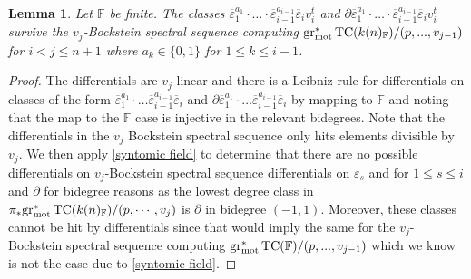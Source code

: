 \documentclass[english,10pt]{amsart}
\newcommand{\field}{\mathbb{F}}
\newtheorem{lemm}{Lemma}[section]
\theoremstyle{definition}
\numberwithin{equation}{section}
\DeclareMathOperator{\tc}{\ensuremath{\textup{TC}}}
\newcommand{\grmot}{\mathrm{gr}_{\textup{mot}}^*}
\newcommand{\pis}{\pi_*}
\begin{document}
\begin{lemm}
Let $\field$ be finite. 
The classes $\overline{\varepsilon}_1^{a_1}\cdot \ldots \cdot \overline{\varepsilon}_{i-1}^{a_{i-1}}\overline{\varepsilon}_{i}v_i^{t}$ and $\partial\overline{\varepsilon}_1^{a_1}\cdot \ldots \cdot \overline{\varepsilon}_{i-1}^{a_{i-1}}\overline{\varepsilon}_{i}v_i^{t}$ survive the $v_j$-Bockstein spectral sequence  computing $\grmot \tc(k(n)_{\field})/(p,...,v_{j-1})$ for $i<j\le n+1$ where $a_k\in \{0,1\}$ for $1\le k\le i-1$. 
\end{lemm}
\begin{proof}
The differentials are $v_j$-linear and there is a Leibniz rule for differentials on classes of the form $\overline{\varepsilon}_1^{a_1}\cdot \ldots \overline{\varepsilon}_{i-1}^{a_{i-1}}\overline{\varepsilon}_{i}$ and  $\partial\overline{\varepsilon}_1^{a_1}\cdot \ldots \overline{\varepsilon}_{i-1}^{a_{i-1}}\overline{\varepsilon}_{i}$ by mapping to $\mathbb{F}$ and noting that the map to the $\mathbb{F}$ case is injective in the relevant bidegrees. Note that the differentials in the $v_j$ Bockstein spectral sequence only hits elements divisible by $v_j$. We then apply \autoref{syntomic field} to determine that there are no possible differentials on $v_j$-Bockstein spectral sequence differentials on $\varepsilon_s$ and for $1\le s\le i$ and $\partial$ for bidegree reasons as the lowest degree class in $\pis \grmot \tc(k(n)_{\field})/(p,\cdots ,v_j)$ is $\partial$ in bidegree $(-1,1)$.
Moreover, these classes cannot be hit by differentials since that would imply the same for the $v_j$-Bockstein spectral sequence computing $\grmot \tc(\field)/(p,...,v_{j-1})$ which we know  is not the case due to \autoref{syntomic field}.
\end{proof}
\end{document}

